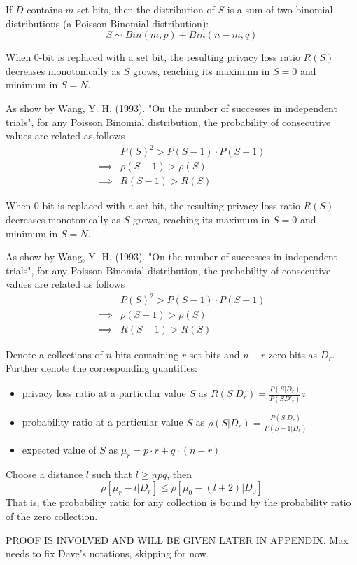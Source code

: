 \documentclass[11pt]{article}
\begin{document}
 If  $D$ contains $m$ set bits, then the distribution of $S$ is a sum of two binomial distributions (a Poisson Binomial distribution): 
 \[ S  \sim Bin(m,p) + Bin(n-m,q) \]
 
 \begin{lem} \label{lem:rs1}
When 0-bit is replaced with a set bit, the resulting privacy loss ratio $R(S)$ decreases monotonically as $S$ grows, reaching its maximum in $S=0$ and minimum in $S=N$.
\end{lem}
\begin{pf}
 As show by Wang, Y. H. (1993). "On the number of successes in independent trials", for any Poisson Binomial distribution, the probability of consecutive values are related as follows
 \begin{align*}
 & P(S)^2  > P(S-1) \cdot P(S+1) \\
\implies &  \rho(S-1) > \rho(S) \\
\implies & R(S-1) > R(S)
\end{align*}
\end{pf}

 \begin{lem} \label{lem:rs1}
When 0-bit is replaced with a set bit, the resulting privacy loss ratio $R(S)$ decreases monotonically as $S$ grows, reaching its maximum in $S=0$ and minimum in $S=N$.
\end{lem}
\begin{pf}
 As show by Wang, Y. H. (1993). "On the number of successes in independent trials", for any Poisson Binomial distribution, the probability of consecutive values are related as follows
 \begin{align*}
 & P(S)^2  > P(S-1) \cdot P(S+1) \\
\implies &  \rho(S-1) > \rho(S) \\
\implies & R(S-1) > R(S)
\end{align*}
\end{pf}

\begin{lem} \label{lem:rs3}
Denote a collections of $n$ bits containing $r$ set bits and $n-r$ zero bits as $D_r$. Further denote the corresponding quantities:
\begin{itemize}
\item privacy loss ratio at a particular value $S$ as $R(S|D_r) = \frac{P(S|D_r)}{P(SD'_r)}z$
\item probability ratio at a particular value $S$ as $\rho(S|D_r) = \frac{P(S|D_r)}{P(S-1|D_r)}$
\item expected value of $S$ as $\mu_r = p \cdot r + q \cdot (n-r)$
\end{itemize}
Choose a distance $l$ such that $l \ge npq$, then 
\[ \rho[\mu_r - l|D_r] \le \rho[\mu_0 - (l+2)|D_0] \]
That is, the probability ratio for any collection is bound by the probability ratio of the zero collection. 
\end{lem}
\begin{pf}
PROOF IS INVOLVED AND WILL BE GIVEN LATER IN APPENDIX.  Max needs to fix Dave's notations, skipping for now.
\end{pf}
\end{document}
